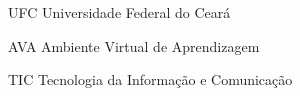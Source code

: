 \begin{siglas}
	\item[UFC] Universidade Federal do Cear\'a
	\item[AVA] Ambiente Virtual de Aprendizagem
	\item[TIC] Tecnologia da Informa\c{c}\~ao e Comunica\c{c}\~ao
\end{siglas}
